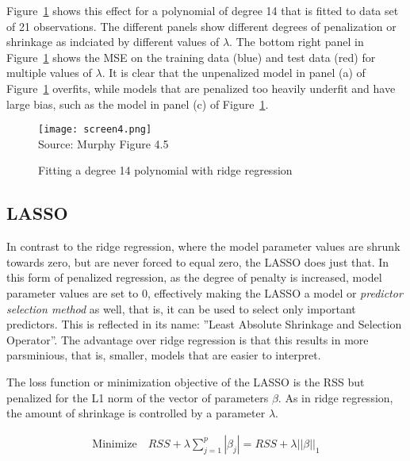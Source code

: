 Figure~\ref{fig:ridgemultiple} shows this effect for a polynomial of degree 14 that is fitted to data set of 21 observations. The different panels show different degrees of penalization or shrinkage as indciated by different values of $\lambda$. The bottom right panel in Figure~\ref{fig:ridgemultiple} shows the MSE on the training data (blue) and test data (red) for multiple values of $\lambda$. It is clear that the unpenalized model in panel (a) of Figure~\ref{fig:ridgemultiple} overfits, while models that are penalized too heavily underfit and have large bias, such as the model in panel (c) of Figure~\ref{fig:ridgemultiple}. 

\begin{figure}
\centering
\texttt{[image: screen4.png]}\\
\scriptsize Source: Murphy Figure 4.5

\caption{Fitting a degree 14 polynomial with ridge regression}
\label{fig:ridgemultiple}
\end{figure}

\subsection{LASSO}

In contrast to the ridge regression, where the model parameter values are shrunk towards zero, but are never forced to equal zero, the LASSO does just that. In this form of penalized regression, as the degree of penalty is increased, model parameter values are set to 0, effectively making the LASSO a model or \emph{predictor selection method} as well, that is, it can be used to select only important predictors. This is reflected in its name: ''Least Absolute Shrinkage and Selection Operator''. The advantage over ridge regression is that this results in more parsminious, that is, smaller, models that are easier to interpret.

The loss function or minimization objective of the LASSO is the RSS but penalized for the L1 norm of the vector of parameters $\beta$. As in ridge regression, the amount of shrinkage is controlled by a parameter $\lambda$.

\begin{align*}
\text{Minimize} \quad RSS + \lambda \sum_{j=1}^p |\beta_j| = RSS + \lambda ||\beta||_1
\end{align*}

